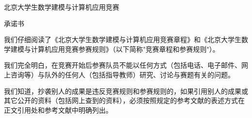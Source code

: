 
\providecommand{\pkb@tihao}{[在此填写题号]}
\providecommand{\pkb@baominghao}{[在此填写队号]}
\providecommand{\pkb@schoolname}{[在此填写学校全称]}
\providecommand{\pkb@membera}{[队员一姓名]}
\providecommand{\pkb@memberb}{[队员二姓名]}
\providecommand{\pkb@memberc}{[队员三姓名]}
\providecommand{\pkb@supervisor}{[指导教师姓名]}
\providecommand{\pkb@submitmonth}{[月]}
\providecommand{\pkb@submitday}{[日]}

\newcommand{\bjcontestTihao}[1]{\renewcommand{\pkb@tihao}{#1}}
\newcommand{\bjcontestBaominghao}[1]{\renewcommand{\pkb@baominghao}{#1}}
\newcommand{\bjcontestSchoolname}[1]{\renewcommand{\pkb@schoolname}{#1}}
\newcommand{\bjcontestMemberA}[1]{\renewcommand{\pkb@membera}{#1}}
\newcommand{\bjcontestMemberB}[1]{\renewcommand{\pkb@memberb}{#1}}
\newcommand{\bjcontestMemberC}[1]{\renewcommand{\pkb@memberc}{#1}}
\newcommand{\bjcontestSupervisor}[1]{\renewcommand{\pkb@supervisor}{#1}}
\newcommand{\bjcontestSubmitDate}[2]{\renewcommand{\pkb@submitmonth}{#1}\renewcommand{\pkb@submitday}{#2}}

\thispagestyle{plain}

\vspace*{0.1em}

\begin{center}
  {\yahei{} 北京大学生数学建模与计算机应用竞赛}
\end{center}

\vspace{0.4em}

\begin{center}
  {\heiti{} 承\quad 诺\quad 书}
\end{center}

\vspace{1.0em}

我们仔细阅读了《北京大学生数学建模与计算机应用竞赛章程》和《北京大学生数学建模与计算机应用竞赛参赛规则》（以下简称"竞赛章程和参赛规则"）。

我们完全明白，在竞赛开始后参赛队员不能以任何方式（包括电话、电子邮件、网上咨询等）与队外的任何人（包括指导教师）研究、讨论与赛题有关的问题。

我们知道，抄袭别人的成果是违反竞赛规则和参赛规则的，如果引用别人的成果或其它公开的资料（包括网上查到的资料），必须按照规定的参考文献的表述方式在正文引用处和参考文献中明确列出。

